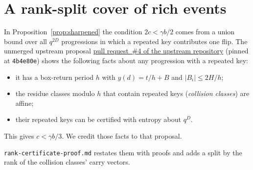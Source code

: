 \documentclass[11pt]{article}
\begin{document}
\section{A rank-split cover of rich events}\label{sec:rank}
In Proposition~\ref{prop:sharpened} the condition $2c<\gamma b/2$ comes
from a union bound over all $q^{2D}$ progressions in which a repeated key
contributes one flip. The unmerged upstream proposal
\href{https://github.com/rohanarun/van-der-waerden-refinement/pull/4}{pull request~\#4 of the upstream repository}
(pinned at \texttt{4b4e80e}) shows the following facts about any
progression with a repeated key:
\begin{itemize}
 \item it has a box-return period $h$ with $y(d)=t/h+B$ and $|B_i|\le2H/h$;
 \item the residue classes modulo $h$ that contain repeated keys
       (\emph{collision classes}) are affine;
 \item their repeated keys can be certified with entropy about $q^D$.
\end{itemize}
This gives $c<\gamma b/3$. We credit those facts to that proposal.

\noindent\texttt{rank-certificate-proof.md} restates them with proofs and
adds a split by the rank of the collision classes' carry vectors.
\end{document}
